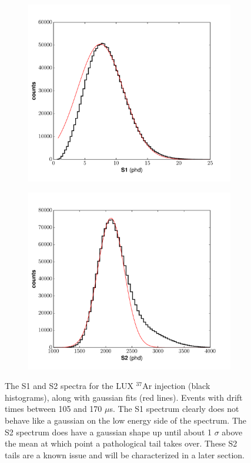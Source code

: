 \begin{figure}[h!]
\centering
\begin{subfigure}{0.5\textwidth}
  \centering
  \includegraphics[width=\textwidth]{Figures/Ar37_S1spec.pdf}
\end{subfigure}%
\begin{subfigure}{0.5\textwidth}
  \centering
  \includegraphics[width=\textwidth]{Figures/Ar37_S2spec.pdf}
\end{subfigure}
\caption{The S1 and S2 spectra for the LUX $^{37}$Ar injection (black histograms), along with gaussian fits (red lines). Events with drift times between 105 and 170 $\mu$s. The S1 spectrum clearly does not behave like a gaussian on the low energy side of the spectrum. The S2 spectrum does have a  gaussian shape up until about 1 $\sigma$ above the mean at which point a pathological tail takes over. These S2 tails are a known issue and will be characterized in a later section.}
\label{fig:ddplot}
\end{figure}

